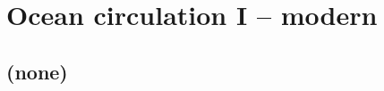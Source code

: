 
\cleardoublepage


\chapter{Ocean circulation I -- modern}\label{ch:ocean-circulation-I}

\hfill \break

\newpage

\section{(none)}

